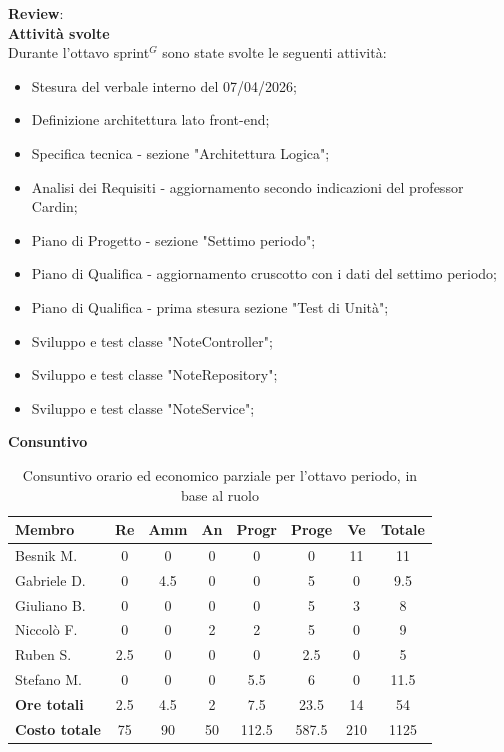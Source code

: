 \documentclass[a4paper,10pt]{article}
\begin{document}
\textbf{Review}: \\
\textbf{Attività svolte}\\
Durante l'ottavo sprint$^G$ sono state svolte le seguenti attività:
\begin{itemize}
  \item Stesura del verbale interno del 07/04/2026;
  \item Definizione architettura lato front-end;
  \item Specifica tecnica - sezione "Architettura Logica";
  \item Analisi dei Requisiti - aggiornamento secondo indicazioni del professor Cardin;
  \item Piano di Progetto - sezione "Settimo periodo";
  \item Piano di Qualifica - aggiornamento cruscotto con i dati del settimo periodo;
  \item Piano di Qualifica - prima stesura sezione "Test di Unità";
  \item Sviluppo e test classe "NoteController";
  \item Sviluppo e test classe "NoteRepository";
  \item Sviluppo e test classe "NoteService";
\end{itemize}
\textbf{Consuntivo}
\begin{table}[H]
\centering
\begin{tabular}{|l|c|c|c|c|c|c|c|}
\hline
\textbf{Membro} & \textbf{Re} & \textbf{Amm} & \textbf{An} & \textbf{Progr} & \textbf{Proge} & \textbf{Ve} & \textbf{Totale} \\
\hline
Besnik M.   & 0   & 0   & 0 & 0   & 0 & 11 & 11 \\
Gabriele D. & 0   & 4.5 & 0 & 0   & 5 & 0  & 9.5 \\
Giuliano B. & 0   & 0   & 0 & 0   & 5 & 3  & 8 \\
Niccolò F.  & 0   & 0   & 2 & 2   & 5 & 0  & 9 \\
Ruben S.    & 2.5 & 0   & 0 & 0   & 2.5 & 0  & 5 \\
Stefano M.  & 0   & 0   & 0 & 5.5 & 6 & 0  & 11.5 \\
\hline
\textbf{Ore totali} & 2.5  & 4.5 & 2 & 7.5  & 23.5  & 14 & 54 \\
\hline
\textbf{Costo totale} & 75  & 90 & 50 & 112.5  & 587.5  & 210 & 1125 \\
\hline
\end{tabular}
\caption{Consuntivo orario ed economico parziale per l'ottavo periodo, in base al ruolo}
\end{table}
\end{document}
